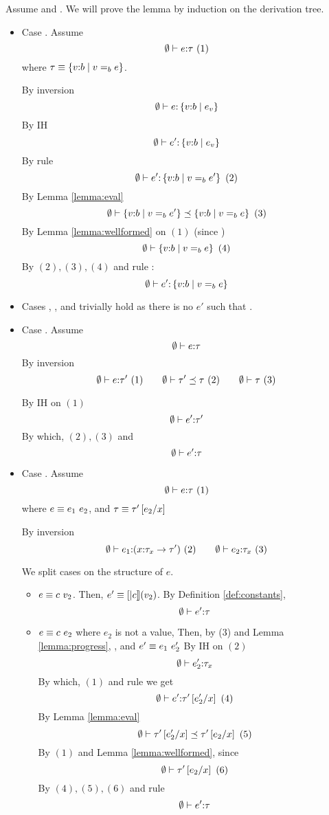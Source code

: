 Assume  and . 
We will prove the lemma by induction on the derivation tree. 
\begin{itemize}
\item Case \rtexact. Assume $$\hastype{\emptyset}{e}{\tau}\ (1)$$
where $\tau \equiv\tref{v}{b}{v \eqb{b} e}$.

By inversion
$$\hastype{\emptyset}{e}{\tref{v}{b}{e_v}}$$
By IH
$$\hastype{\emptyset}{e'}{\tref{v}{b}{e_v}}$$
By rule \rtexact
$$\hastype{\emptyset}{e'}{\tref{v}{b}{v\eqb{b} e'}} \ (2)$$
By Lemma \ref{lemma:eval}
$$\issubtype{\emptyset}{\tref{v}{b}{v\eqb{b} e'}}{\tref{v}{b}{v\eqb{b} e}} \ (3)$$
By Lemma \ref{lemma:wellformed} on $(1)$ (since \iswellformed{}{\emptyset})
$$\iswellformed{\emptyset}{\tref{v}{b}{v\eqb{b} e}} \ (4)$$
By $(2), (3), (4)$ and rule \rtsub:
$$\hastype{\emptyset}{e'}{\tref{v}{b}{v\eqb{b} e}}$$

\item Cases \rtvarbase, \rtvar, \rtconst and \rtfun trivially hold
       as there is no $e'$ such that .

\item Case \rtsub. Assume
$$	\hastype{\emptyset}{e}{\tau}$$
By inversion
$$	\hastype{\emptyset}{e}{\tau'} \ (1) \qquad
	\issubtype{\emptyset}{\tau'}{\tau}\ (2) \qquad
	\iswellformed{\emptyset}{\tau}\ (3)
$$

By IH on $(1)$
$$	\hastype{\emptyset}{e'}{\tau'} $$
By which, $(2), (3)$ and \rtsub
$$	\hastype{\emptyset}{e'}{\tau}$$


\item Case \rtapp. Assume
$$	\hastype{\emptyset}{e}{\tau}\ (1)$$
where $e \equiv \eapp{e_1}{e_2}$, and
	  $\tau\equiv\tau'\sub{x}{e_2}$

By inversion
$$	
	\hastype{\emptyset}{e_1}{(\tfun{x}{\tau_{x}}{\tau'})}\ (2) \qquad
	\hastype{\emptyset}{e_2}{\tau_{x}}\ (3)
$$

We split cases on the structure of $e$.
\begin{itemize}
\item $e\equiv \eapp{c}{v_2}$.
Then, $e'\equiv\interp{c}(v_2)$.
By Definition \ref{def:constants},
$$\hastype{\emptyset}{e'}{\tau}$$

\item $e\equiv \eapp{c}{e_2}$ where $e_2$ is not a value, 
Then, by (3) and Lemma \ref{lemma:progress},
, and $e' \equiv \eapp{e_1}{e_2'}$
%
By IH on $(2)$
$$	\hastype{\emptyset}{e_2'}{\tau_{x}}$$
By which, $(1)$ and rule \rtapp we get
$$\hastype{\emptyset}{e'}{\tau'\sub{x}{e_2'}}\ (4)$$
By Lemma \ref{lemma:eval}
$$
	\issubtype{\emptyset}{\tau'\sub{x}{e_2'}}{\tau'\sub{x}{e_2}}\ (5)
$$
By $(1)$ and Lemma \ref{lemma:wellformed}, since \iswellformed{}{\emptyset}
$$
	\iswellformed{\emptyset}{\tau'\sub{x}{e_2}}\ (6)
$$
By $(4), (5), (6)$ and rule \rtsub
$$	\hastype{\emptyset}{e'}{\tau}$$


\end{itemize}
\end{itemize}

